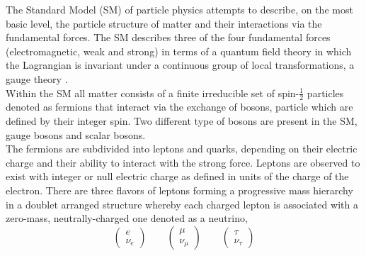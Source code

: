 \label{sect:standard_model}
The Standard Model (SM) of particle physics attempts to describe, on the most basic level, the particle structure of matter and their interactions via the fundamental forces.
The SM describes three of the four fundamental forces (electromagnetic, weak and strong) in terms of a quantum field theory in which the Lagrangian is invariant under a continuous group of local transformations, a gauge theory \cite{gauge-theory}.\\
Within the SM all matter consists of a finite irreducible set of spin-$\frac{1}{2}$ particles denoted as fermions  that interact via the exchange of bosons, particle which are defined by their integer spin. Two different type of bosons are present in the SM, gauge bosons and scalar bosons.\\%
The fermions are subdivided into leptons and quarks, depending on their electric charge and their ability to interact with the strong force.
Leptons are observed to exist with integer or null electric charge as defined in units of the charge of the electron. There are three flavors of leptons forming a progressive mass hierarchy in a doublet  arranged structure whereby each charged lepton is associated with a zero-mass, neutrally-charged one denoted as a neutrino,
\begin{equation}
\label{eqn:lepton_flavor_doublets}
\begin{pmatrix} e       \\ \nu_e      \end{pmatrix} \qquad
\begin{pmatrix} \mu     \\ \nu_{\mu}  \end{pmatrix} \qquad
\begin{pmatrix} \tau    \\ \nu_{\tau} \end{pmatrix}
\end{equation}
